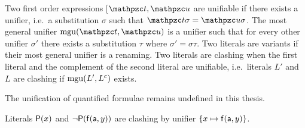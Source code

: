 
\begin{definition}\label{def:unifier}
Two first order expressions [\(\mct, \mcu\) are {\myem unifiable} if there exists a {\myem unifier},
i.e.~a substitution $\sigma$ such that $\mct\sigma=\mcu\sigma$.
The {\myem most general unifier} $\mgu(\mct,\mcu)$ is a unifier such that
for every other unifier $\sigma'$ there exists a substitution $\tau$ where
$\sigma' = \sigma \tau$.
Two literals are variants if their most general unifier is a renaming.
Two literals are {\myem clashing} when the first literal
and the complement of the second literal are unifiable,
i.e.~literals $L'$ and $L$ are clashing if $\operatorname{mgu}(L', L^c)$ exists.
\end{definition}

\begin{remark}
	The unification of quantified formulae remains undefined in this thesis.
\end{remark}

\begin{example}
	Literals $\mathsf{P}(x)$ and $\lnot\mathsf{P}(\mathsf{f}(\mathsf{a},y))$
	are clashing by unifier $\{ x\mapsto \mathsf{f}(\mathsf{a},y)\}$.
\end{example}